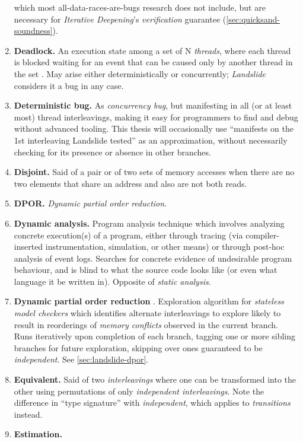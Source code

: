 \begin{enumerate}
		which most all-data-races-are-bugs research does not include,
		but are necessary for {\em Iterative Deepening}'s {\em verification} guarantee
		(\cref{sec:quicksand-soundness}).
	\item {\bf Deadlock.}
		An execution state among a set of N {\em threads},
		where each thread is blocked waiting for an event that can be caused only by another thread in the set
		\cite{deadlock}.
		May arise either deterministically or concurrently; {\em Landslide} considers it a bug in any case.
	\item {\bf Deterministic bug.}
		As {\em concurrency bug}, but manifesting in all (or at least most) thread interleavings,
		making it easy for programmers to find and debug without advanced tooling.
		This thesis will occasionally use ``manifests on the 1st interleaving Landslide tested''
		as an approximation, without necessarily checking for its presence or absence in other branches.
	\item {\bf Disjoint.}
		Said of a pair or of two sets of memory accesses
		when there are no two elements that share an address and also are not both reads.
	\item {\bf DPOR.} {\em Dynamic partial order reduction}.
	\item {\bf Dynamic analysis.}
		Program analysis technique which involves analyzing concrete execution(s) of a program,
		either through tracing (via compiler-inserted instrumentation, simulation, or other means)
		or through post-hoc analysis of event logs.
		Searches for concrete evidence of undesirable program behaviour,
		and is blind to what the source code looks like (or even what language it be written in).
		Opposite of {\em static analysis}.
	\item {\bf Dynamic partial order reduction} .
		Exploration algorithm for {\em stateless model checkers} which
		identifies alternate interleavings to explore likely to result
		in reorderings of {\em memory conflicts} observed in the current branch.
		Runs iteratively upon completion of each branch, tagging one or more sibling branches
		for future exploration, skipping over ones guaranteed to be {\em independent}.
		See \cref{sec:landslide-dpor}.
	\item {\bf Equivalent.}
		Said of two {\em interleavings} where one can be transformed into the other using
		permutations of only {\em independent interleavings}.
		Note the difference in ``type signature'' with {\em independent}, which applies to {\em transitions} instead.
	\item {\bf Estimation.}

\end{enumerate}
